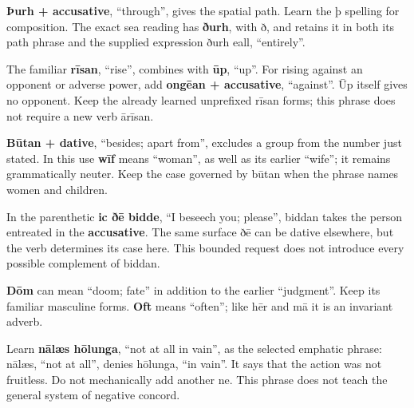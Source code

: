 \textbf{Þurh + accusative}, “through”, gives the spatial path. Learn the þ spelling for composition. The exact sea reading has \textbf{ðurh}, with ð, and retains it in both its path phrase and the supplied expression ðurh eall, “entirely”.

The familiar \textbf{rīsan}, “rise”, combines with \textbf{ūp}, “up”. For rising against an opponent or adverse power, add \textbf{ongēan + accusative}, “against”. Ūp itself gives no opponent. Keep the already learned unprefixed rīsan forms; this phrase does not require a new verb ārīsan.

\textbf{Būtan + dative}, “besides; apart from”, excludes a group from the number just stated. In this use \textbf{wīf} means “woman”, as well as its earlier “wife”; it remains grammatically neuter. Keep the case governed by būtan when the phrase names women and children.

In the parenthetic \textbf{ic ðē bidde}, “I beseech you; please”, biddan takes the person entreated in the \textbf{accusative}. The same surface ðē can be dative elsewhere, but the verb determines its case here. This bounded request does not introduce every possible complement of biddan.

\textbf{Dōm} can mean “doom; fate” in addition to the earlier “judgment”. Keep its familiar masculine forms. \textbf{Oft} means “often”; like hēr and mā it is an invariant adverb.

Learn \textbf{nālæs hōlunga}, “not at all in vain”, as the selected emphatic phrase: nālæs, “not at all”, denies hōlunga, “in vain”. It says that the action was not fruitless. Do not mechanically add another ne. This phrase does not teach the general system of negative concord.

